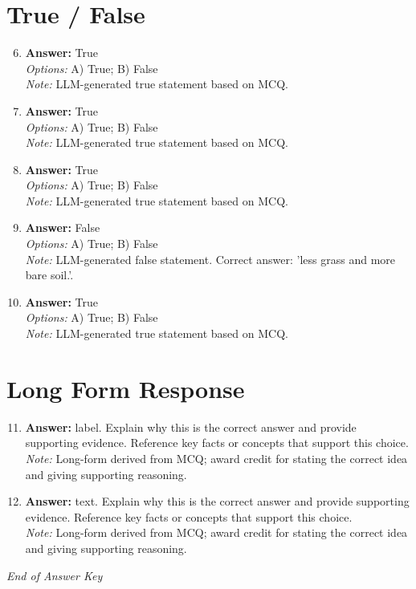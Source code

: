 \documentclass[12pt]{article}
\begin{document}
\section*{True / False}
\begin{enumerate}[label=\arabic*.]
\setcounter{enumi}{5}
\item \textbf{Answer:} True
\\ \textit{Options:} A) True; B) False
\\ \textit{Note:} LLM-generated true statement based on MCQ.
\item \textbf{Answer:} True
\\ \textit{Options:} A) True; B) False
\\ \textit{Note:} LLM-generated true statement based on MCQ.
\item \textbf{Answer:} True
\\ \textit{Options:} A) True; B) False
\\ \textit{Note:} LLM-generated true statement based on MCQ.
\item \textbf{Answer:} False
\\ \textit{Options:} A) True; B) False
\\ \textit{Note:} LLM-generated false statement. Correct answer: 'less grass and more bare soil.'.
\item \textbf{Answer:} True
\\ \textit{Options:} A) True; B) False
\\ \textit{Note:} LLM-generated true statement based on MCQ.
\end{enumerate}

\section*{Long Form Response}
\begin{enumerate}[label=\arabic*.]
\setcounter{enumi}{10}
\item \textbf{Answer:} label. Explain why this is the correct answer and provide supporting evidence. Reference key facts or concepts that support this choice.
\\ \textit{Note:} Long-form derived from MCQ; award credit for stating the correct idea and giving supporting reasoning.
\item \textbf{Answer:} text. Explain why this is the correct answer and provide supporting evidence. Reference key facts or concepts that support this choice.
\\ \textit{Note:} Long-form derived from MCQ; award credit for stating the correct idea and giving supporting reasoning.
\end{enumerate}

\vfill
\noindent\textit{End of Answer Key}
\end{document}
